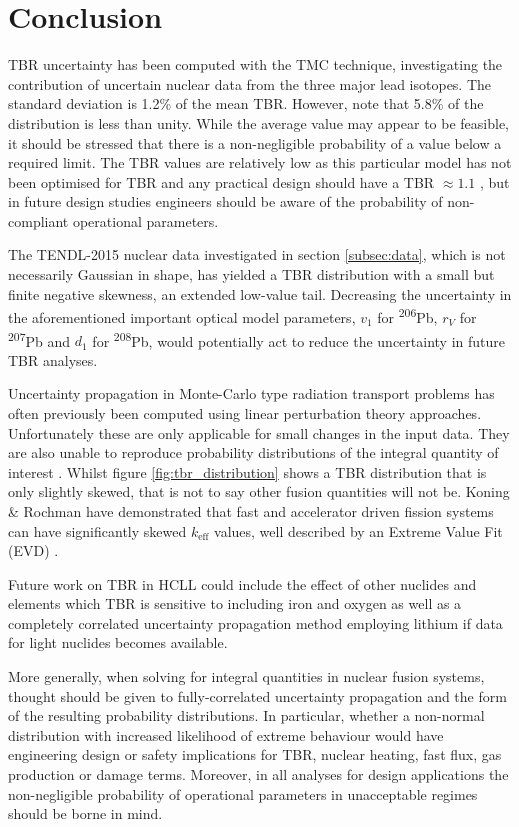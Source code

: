 \section{Conclusion}
TBR uncertainty has been computed with the TMC technique, investigating the contribution of uncertain nuclear data from the three major lead isotopes. The standard deviation is 1.2\% of the mean TBR. However, note that 5.8\% of the distribution is less than unity. While the average value may appear to be feasible, it should be stressed that there is a non-negligible probability of a value below a required limit. The TBR values are relatively low as this particular model has not been optimised for TBR and any practical design should have a TBR $\approx 1.1$ \cite{Fischer2015}, but in future design studies engineers should be aware of the probability of non-compliant operational parameters. 

The TENDL-2015 nuclear data investigated in section \ref{subsec:data}, which is not necessarily Gaussian in shape, has yielded a TBR distribution with a small but finite negative skewness, an extended low-value tail. Decreasing the uncertainty in the aforementioned important optical model parameters, $v_{1}$ for \textsuperscript{206}Pb, $r_{V}$ for \textsuperscript{207}Pb and $d_{1}$ for \textsuperscript{208}Pb, would potentially act to reduce the uncertainty in future TBR analyses.

Uncertainty propagation in Monte-Carlo type radiation transport problems has often previously been computed using linear perturbation theory approaches. Unfortunately these are only applicable for small changes in the input data. They are also unable to reproduce probability distributions of the integral quantity of interest \cite{Rising2012}. Whilst figure \ref{fig:tbr_distribution} shows a TBR distribution that is only slightly skewed, that is not to say other fusion quantities will not be. Koning \& Rochman have demonstrated that fast and accelerator driven fission systems can have significantly skewed $k_{\mathrm{eff}}$ values, well described by an Extreme Value Fit (EVD) \cite{Koning2008}.

Future work on TBR in HCLL could include the effect of other nuclides and elements which TBR is sensitive to including iron and oxygen as well as a completely correlated uncertainty propagation method employing lithium if data for light nuclides becomes available.

More generally, when solving for integral quantities in nuclear fusion systems, thought should be given to fully-correlated uncertainty propagation and the form of the resulting probability distributions. In particular, whether a non-normal distribution with increased likelihood of extreme behaviour would have engineering design or safety implications for TBR, nuclear heating, fast flux, gas production or damage terms. Moreover, in all analyses for design applications the non-negligible probability of operational parameters in unacceptable regimes should be borne in mind.


